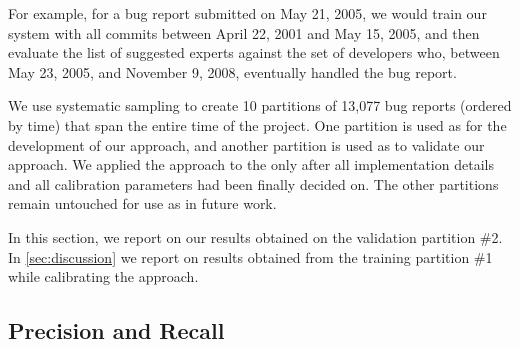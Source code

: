 \documentclass[10pt]{book}
\begin{document}
For example, for a bug report submitted on May 21, 2005, we would train our system with all commits between April 22, 2001 and May 15, 2005, and then evaluate the list of suggested experts against the set of developers who, between May 23, 2005, and November 9, 2008, eventually handled the bug report.

We use systematic sampling to create 10 partitions of 13,077 bug reports (ordered by time) that span the entire time of the project. One partition is used as \trainingset for the development of our approach, and another partition is used as \validationset to validate our approach. We applied the approach to the \validationset only after all implementation details and all calibration parameters had been finally decided on. The other partitions remain untouched for use as \validationset in future work.

In this section, we report on our results obtained on the validation partition \#2. In \autoref{sec:discussion} we report on results obtained from the training partition \#1 while calibrating the approach.




\subsection{Precision and Recall}
\end{document}
